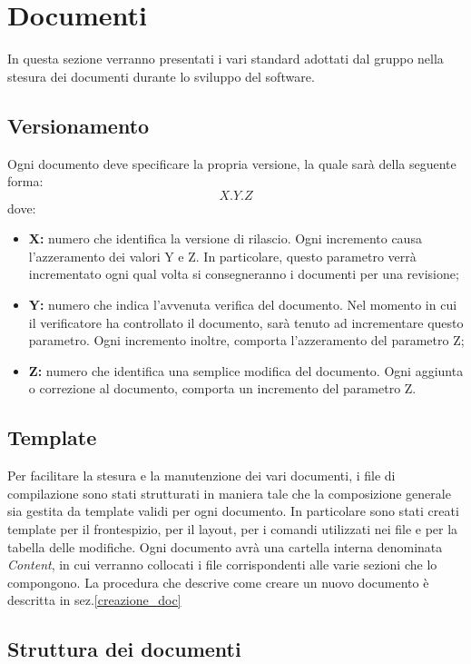 \section{Documenti}
\label{documenti}
In questa sezione verranno presentati i vari standard adottati dal gruppo \authorName{} nella stesura dei documenti durante lo sviluppo del software.

\subsection{Versionamento}
\label{versionamento}
Ogni documento deve specificare la propria versione, la quale sarà della seguente forma:
\begin{displaymath}
X.Y.Z
\end{displaymath}
dove:
\begin{itemize}
\item\textbf{X:} numero che identifica la versione di rilascio. Ogni incremento causa l'azzeramento dei valori Y e Z. In particolare, questo parametro verrà incrementato ogni qual volta si consegneranno i documenti per una revisione;
\item\textbf{Y:} numero che indica l'avvenuta verifica del documento. Nel momento in cui il verificatore ha controllato il documento, sarà tenuto ad incrementare questo parametro. Ogni incremento inoltre, comporta l'azzeramento del parametro Z;
\item \textbf{Z:} numero che identifica una semplice modifica del documento. Ogni aggiunta o correzione al documento, comporta un incremento del parametro Z.
\end{itemize}

\subsection{Template}
\label{template}
Per facilitare la stesura e la manutenzione dei vari documenti, i file di compilazione sono stati strutturati in maniera tale che la composizione generale sia gestita da template validi per ogni documento. In particolare sono stati creati template per il frontespizio, per il layout, per i comandi utilizzati nei file e per la tabella delle modifiche. Ogni documento avrà una cartella interna denominata \textit{Content}, in cui verranno collocati i file corrispondenti alle varie sezioni che lo compongono. La procedura che descrive come creare un nuovo documento è descritta in sez.\ref{creazione_doc}

\subsection{Struttura dei documenti}
\label{struttura}
